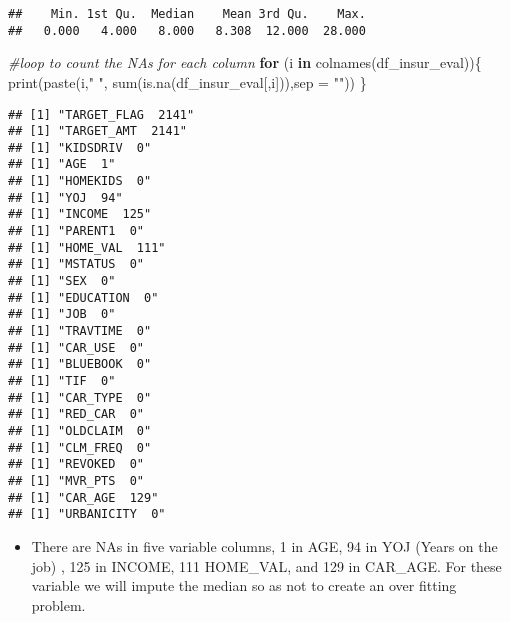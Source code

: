 \documentclass[
]{article}
\newenvironment{Shaded}{\begin{snugshade}}{\end{snugshade}}
\newcommand{\AttributeTok}[1]{\textcolor[rgb]{0.77,0.63,0.00}{#1}}
\newcommand{\CommentTok}[1]{\textcolor[rgb]{0.56,0.35,0.01}{\textit{#1}}}
\newcommand{\ControlFlowTok}[1]{\textcolor[rgb]{0.13,0.29,0.53}{\textbf{#1}}}
\newcommand{\FunctionTok}[1]{\textcolor[rgb]{0.00,0.00,0.00}{#1}}
\newcommand{\NormalTok}[1]{#1}
\newcommand{\StringTok}[1]{\textcolor[rgb]{0.31,0.60,0.02}{#1}}
\providecommand{\tightlist}{%
  \setlength{\itemsep}{0pt}\setlength{\parskip}{0pt}}
\begin{document}
\begin{verbatim}
##    Min. 1st Qu.  Median    Mean 3rd Qu.    Max. 
##   0.000   4.000   8.000   8.308  12.000  28.000
\end{verbatim}

\begin{Shaded}
\begin{Highlighting}[]
\CommentTok{\#loop to count the NAs for each column}
\ControlFlowTok{for}\NormalTok{ (i }\ControlFlowTok{in} \FunctionTok{colnames}\NormalTok{(df\_insur\_eval))\{}
  \FunctionTok{print}\NormalTok{(}\FunctionTok{paste}\NormalTok{(i,}\StringTok{"  "}\NormalTok{, }\FunctionTok{sum}\NormalTok{(}\FunctionTok{is.na}\NormalTok{(df\_insur\_eval[,i])),}\AttributeTok{sep =} \StringTok{""}\NormalTok{))}
\NormalTok{\}}
\end{Highlighting}
\end{Shaded}

\begin{verbatim}
## [1] "TARGET_FLAG  2141"
## [1] "TARGET_AMT  2141"
## [1] "KIDSDRIV  0"
## [1] "AGE  1"
## [1] "HOMEKIDS  0"
## [1] "YOJ  94"
## [1] "INCOME  125"
## [1] "PARENT1  0"
## [1] "HOME_VAL  111"
## [1] "MSTATUS  0"
## [1] "SEX  0"
## [1] "EDUCATION  0"
## [1] "JOB  0"
## [1] "TRAVTIME  0"
## [1] "CAR_USE  0"
## [1] "BLUEBOOK  0"
## [1] "TIF  0"
## [1] "CAR_TYPE  0"
## [1] "RED_CAR  0"
## [1] "OLDCLAIM  0"
## [1] "CLM_FREQ  0"
## [1] "REVOKED  0"
## [1] "MVR_PTS  0"
## [1] "CAR_AGE  129"
## [1] "URBANICITY  0"
\end{verbatim}

\begin{itemize}
\tightlist
\item
  There are NAs in five variable columns, 1 in AGE, 94 in YOJ (Years on
  the job) , 125 in INCOME, 111 HOME\_VAL, and 129 in CAR\_AGE. For
  these variable we will impute the median so as not to create an over
  fitting problem.
\end{itemize}
\end{document}
